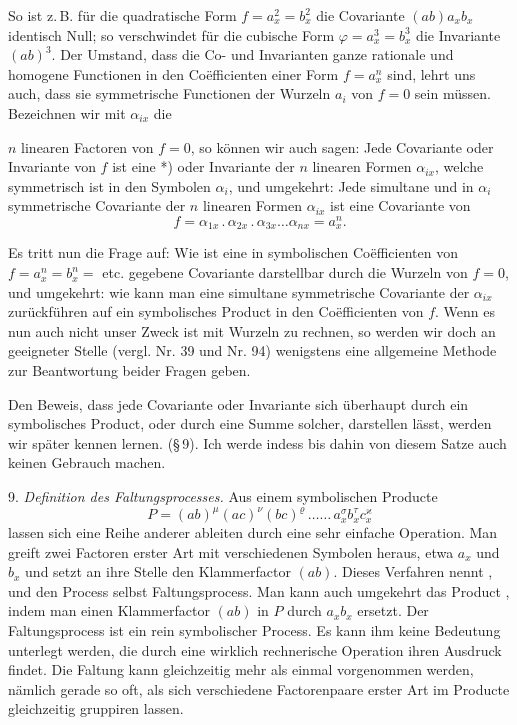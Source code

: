 So ist z.\,B. für die quadratische Form $f = a_x^2 = b_x^2$ die
Covariante $(ab) a_x b_x$ identisch Null; so verschwindet für die
cubische Form $\varphi = a_x^3 = b_x^3$ die Invariante $(ab)^3$. Der
Umstand, dass die Co- und Invarianten ganze rationale und homogene
Functionen in den Co\"efficienten einer Form $f = a_x^n$ sind, lehrt
uns auch, dass sie symmetrische Functionen der Wurzeln $a_i$ von
$f = 0$ sein müssen. Bezeichnen wir mit $\alpha_{ix}$ die


$n$ linearen Factoren von $f = 0$, so können wir auch sagen: Jede
Covariante oder Invariante von $f$ ist eine *) oder Invariante der $n$ linearen Formen $\alpha_{ix}$,
welche symmetrisch ist in den Symbolen $\alpha_i$, und umgekehrt:
Jede simultane und in $\alpha_i$ symmetrische Covariante der $n$
linearen Formen $\alpha_{ix}$ ist eine Covariante von
\[
f = \alpha_{1x} \,.\, \alpha_{2x} \,.\, \alpha_{3x} \dots \alpha_{nx} = a_x^n .
\]

Es tritt nun die Frage auf: Wie ist eine in symbolischen
Co\"efficienten von $f = a_x^n = b_x^n = $ etc. gegebene Covariante
darstellbar durch die Wurzeln von $f = 0$, und umgekehrt: wie kann man
eine simultane symmetrische Covariante der $\alpha_{ix}$ zurückführen
auf ein symbolisches Product in den Co\"efficienten von $f$. Wenn es
nun auch nicht unser Zweck ist mit Wurzeln zu rechnen, so werden wir
doch an geeigneter Stelle (vergl. Nr. 39 und Nr. 94) wenigstens eine
allgemeine Methode zur Beantwortung beider Fragen geben.

Den Beweis, dass jede Covariante oder Invariante sich überhaupt durch
ein symbolisches Product, oder durch eine Summe solcher, darstellen
lässt, werden wir später kennen lernen. (\S\,9). Ich werde indess bis
dahin von diesem Satze auch keinen Gebrauch machen.

9. \textit{Definition des Faltungsprocesses.} Aus einem symbolischen
Producte
\[
P = (ab)^\mu (ac)^\nu (bc)^\varrho \, \dots\dots \, a_x^\sigma b_x^\tau c_x^\varkappa
\]
lassen sich eine Reihe anderer ableiten durch eine sehr einfache
Operation. Man greift zwei Factoren erster Art mit verschiedenen
Symbolen heraus, etwa $a_x$ und $b_x$ und setzt an ihre Stelle den
Klammerfactor $(ab)$. Dieses Verfahren nennt 
, und den Process selbst \glqq Faltungsprocess\grqq{}.
Man kann auch umgekehrt das Product , indem man
einen Klammerfactor $(ab)$ in $P$ durch $a_x b_x$ ersetzt. Der
Faltungsprocess ist ein rein symbolischer Process. Es kann ihm keine
Bedeutung unterlegt werden, die durch eine wirklich rechnerische
Operation ihren Ausdruck findet. Die Faltung kann gleichzeitig mehr
als einmal vorgenommen werden, nämlich gerade so oft, als sich
verschiedene Factorenpaare erster Art im Producte gleichzeitig
gruppiren lassen.

